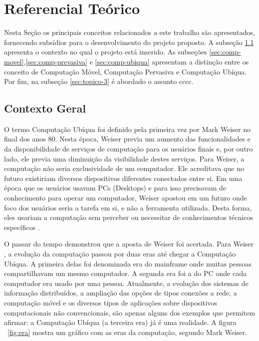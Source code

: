 \section{Referencial Teórico}\label{sec:referencial-teorico}


Nesta Seção os principais conceitos relacionados a este trabalho são apresentados, fornecendo subsídios para o desenvolvimento do projeto proposto. A subseção \ref{sec:contexto-geral} apresenta o contexto no qual o projeto está inserido. As subseções \ref{sec:comp-movel},\ref{sec:comp-prevasiva} e \ref{sec:comp-ubiqua} apresentam a distinção entre os conceito de Computação Móvel, Computação Pervasiva e Computação Ubíqua. Por fim, na subseção \ref{sec:topico-3} é abordado o assunto cccc.

\subsection{Contexto Geral}\label{sec:contexto-geral}

O termo Computação Ubíqua foi definido pela primeira vez por Mark Weiser \cite{weiser1991} no final dos anos 80. Nesta época, Weiser previa um aumento das funcionalidades e da disponibilidade de serviços de computação para os usuários finais e, por outro lado, ele previa uma diminuição da visibilidade destes serviços. Para Weiser, a computação não seria exclusividade de um computador. Ele acreditava que no futuro existiriam diversos dispositivos diferentes conectados entre si. Em uma época que os usuários usavam PCs (Desktops) e para isso precisavam de conhecimento para operar um computador, Weiser apostou em um futuro onde foco dos usuários seria a tarefa em si, e não a ferramenta utilizada. Desta forma, eles usariam a computação sem perceber ou necessitar de conhecimentos técnicos específicos \cite{weiser1994world}.
					
O passar do tempo demonstrou que a aposta de Weiser foi acertada. Para Weiser \cite{weiser1997coming}, a evolução da computação passou por duas eras até chegar a Computação Ubíqua. A primeira delas foi denominada era do mainframe onde muitas pessoas compartilhavam um mesmo computador. A segunda era foi a do PC onde cada computador era usado por uma pessoa. Atualmente, a evolução dos sistemas de informação distribuídos, a ampliação das opções de tipos conexões a rede, a computação móvel e os diversos tipos de aplicações sobre dispositivos computacionais não convencionais, são apenas alguns dos exemplos que permitem afirmar: a Computação Ubíqua (a terceira era) já é uma realidade. A figura ~\ref{fig:era} mostra um gráfico com as eras da computação, segundo Mark Weiser.

